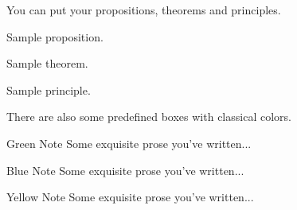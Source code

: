 You can put your propositions, theorems and principles.
\begin{proposition}
    Sample proposition.
\end{proposition}

\begin{theorem}
    Sample theorem.
\end{theorem}

\begin{principle}
    Sample principle.
\end{principle}

There are also some predefined boxes with classical colors.
\begin{greenbox}{Green Note}
    Some exquisite prose you've written...
\end{greenbox}

\begin{bluebox}{Blue Note}
    Some exquisite prose you've written...
\end{bluebox}

\begin{yellowbox}{Yellow Note}
    Some exquisite prose you've written...
\end{yellowbox}
